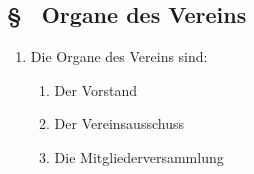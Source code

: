 \subsection{§ \thesaparagraphcounter\ Organe des Vereins} \label{sa:par:organe_verein}
\begin{enumerate}
    \item \label{sa:abs:bqh3lu} Die Organe des Vereins sind:
    \begin{enumerate}
        \item Der Vorstand
        \item Der Vereinsausschuss
        \item Die Mitgliederversammlung
    \end{enumerate}
\end{enumerate}

